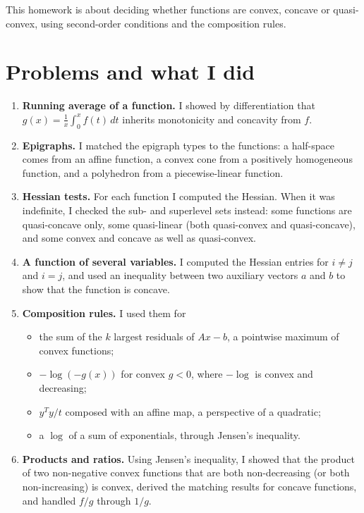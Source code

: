 


This homework is about deciding whether functions are convex, concave or quasi-convex, using second-order conditions and the composition rules.

\section*{Problems and what I did}
\begin{enumerate}
  \item \textbf{Running average of a function.} I showed by differentiation that $g(x)=\tfrac{1}{x}\int_0^x f(t)\,dt$ inherits monotonicity and concavity from $f$.
  \item \textbf{Epigraphs.} I matched the epigraph types to the functions: a half-space comes from an affine function, a convex cone from a positively homogeneous function, and a polyhedron from a piecewise-linear function.
  \item \textbf{Hessian tests.} For each function I computed the Hessian. When it was indefinite, I checked the sub- and superlevel sets instead: some functions are quasi-concave only, some quasi-linear (both quasi-convex and quasi-concave), and some convex and concave as well as quasi-convex.
  \item \textbf{A function of several variables.} I computed the Hessian entries for $i\neq j$ and $i=j$, and used an inequality between two auxiliary vectors $a$ and $b$ to show that the function is concave.
  \item \textbf{Composition rules.} I used them for
    \begin{itemize}
      \item the sum of the $k$ largest residuals of $Ax-b$, a pointwise maximum of convex functions;
      \item $-\log(-g(x))$ for convex $g<0$, where $-\log$ is convex and decreasing;
      \item $y^Ty/t$ composed with an affine map, a perspective of a quadratic;
      \item a $\log$ of a sum of exponentials, through Jensen's inequality.
    \end{itemize}
  \item \textbf{Products and ratios.} Using Jensen's inequality, I showed that the product of two non-negative convex functions that are both non-decreasing (or both non-increasing) is convex, derived the matching results for concave functions, and handled $f/g$ through $1/g$.

\end{enumerate}
